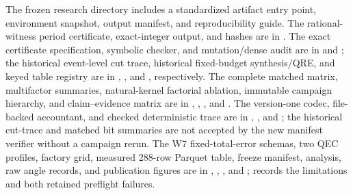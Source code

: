 \documentclass[aps,prx,reprint,floatfix,superscriptaddress]{revtex4-2}
\begin{document}
The frozen research directory includes a standardized artifact entry
point, environment snapshot, output manifest, and reproducibility guide.
The rational-witness period certificate, exact-integer output, and hashes
are in .  The exact certificate specification,
symbolic checker, and mutation/dense audit are in  and
; the historical event-level cut
trace, historical fixed-budget synthesis/QRE, and keyed table registry are in
,
, and
, respectively.  The complete matched
matrix, multifactor summaries, natural-kernel factorial ablation, immutable
campaign hierarchy, and claim--evidence matrix are in
,
,
, and
.  The version-one codec, file-backed
accountant, and checked deterministic trace are in ,
, and ; the
historical cut-trace and matched bit summaries are not accepted by the new
manifest verifier without a campaign rerun.  The W7 fixed-total-error schemas,
two QEC profiles, factory grid, measured 288-row Parquet table, freeze manifest,
analysis, raw angle records, and publication figures are in ,
,
, and ;
 records the limitations and both retained preflight
failures.


\appendix
{}





\end{document}
